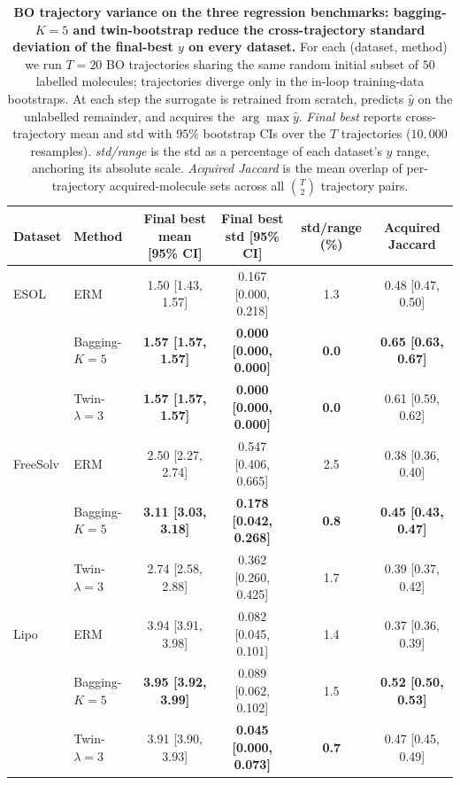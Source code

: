 \begin{table}[h]
  \centering
  \caption{\textbf{\boldmath BO trajectory variance on the three regression benchmarks: bagging-$K{=}5$ and twin-bootstrap reduce the cross-trajectory standard deviation of the final-best $y$ on every dataset.}  For each (dataset, method) we run $T{=}20$ BO trajectories sharing the same random initial subset of $50$ labelled molecules; trajectories diverge only in the in-loop training-data bootstraps.  At each step the surrogate is retrained from scratch, predicts $\hat{y}$ on the unlabelled remainder, and acquires the $\arg\max\hat{y}$.  \emph{Final best} reports cross-trajectory mean and std with $95\%$ bootstrap CIs over the $T$ trajectories ($10{,}000$ resamples).  \emph{std/range} is the std as a percentage of each dataset's $y$ range, anchoring its absolute scale.  \emph{Acquired Jaccard} is the mean overlap of per-trajectory acquired-molecule sets across all $\binom{T}{2}$ trajectory pairs.}
  \label{tab:bo_loop_regression}
  \scriptsize
  \setlength{\tabcolsep}{4pt}
  \begin{tabular}{llccc@{\hspace{1.0em}}c}
    \toprule
    Dataset & Method & Final best mean [95\% CI] & Final best std [95\% CI] & std/range (\%) & Acquired Jaccard \\
    \midrule
    ESOL & ERM & 1.50 [1.43, 1.57] & 0.167 [0.000, 0.218] & 1.3 & 0.48 [0.47, 0.50] \\
     & Bagging-$K{=}5$ & \textbf{1.57 [1.57, 1.57]} & \textbf{0.000 [0.000, 0.000]} & \textbf{0.0} & \textbf{0.65 [0.63, 0.67]} \\
     & Twin-$\lambda{=}3$ & \textbf{1.57 [1.57, 1.57]} & \textbf{0.000 [0.000, 0.000]} & \textbf{0.0} & 0.61 [0.59, 0.62] \\
    \addlinespace[2pt]
    FreeSolv & ERM & 2.50 [2.27, 2.74] & 0.547 [0.406, 0.665] & 2.5 & 0.38 [0.36, 0.40] \\
     & Bagging-$K{=}5$ & \textbf{3.11 [3.03, 3.18]} & \textbf{0.178 [0.042, 0.268]} & \textbf{0.8} & \textbf{0.45 [0.43, 0.47]} \\
     & Twin-$\lambda{=}3$ & 2.74 [2.58, 2.88] & 0.362 [0.260, 0.425] & 1.7 & 0.39 [0.37, 0.42] \\
    \addlinespace[2pt]
    Lipo & ERM & 3.94 [3.91, 3.98] & 0.082 [0.045, 0.101] & 1.4 & 0.37 [0.36, 0.39] \\
     & Bagging-$K{=}5$ & \textbf{3.95 [3.92, 3.99]} & 0.089 [0.062, 0.102] & 1.5 & \textbf{0.52 [0.50, 0.53]} \\
     & Twin-$\lambda{=}3$ & 3.91 [3.90, 3.93] & \textbf{0.045 [0.000, 0.073]} & \textbf{0.7} & 0.47 [0.45, 0.49] \\
    \bottomrule
  \end{tabular}
\end{table}

